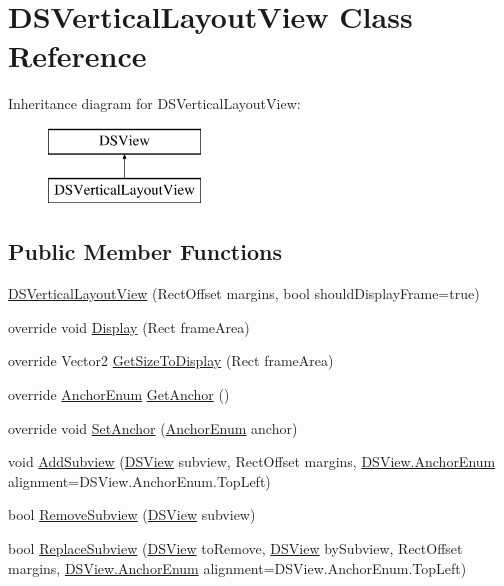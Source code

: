 \hypertarget{class_d_s_vertical_layout_view}{\section{D\+S\+Vertical\+Layout\+View Class Reference}
\label{class_d_s_vertical_layout_view}
}
Inheritance diagram for D\+S\+Vertical\+Layout\+View\+:\begin{figure}[H]
\begin{center}
\leavevmode
\includegraphics[height=2.000000cm]{class_d_s_vertical_layout_view}
\end{center}
\end{figure}
\subsection*{Public Member Functions}
\begin{DoxyCompactItemize}
\item 
\hyperlink{class_d_s_vertical_layout_view_afd5afdd6ab5252ce1a16bed8244b84e3}{D\+S\+Vertical\+Layout\+View} (Rect\+Offset margins, bool should\+Display\+Frame=true)
\item 
override void \hyperlink{class_d_s_vertical_layout_view_a95419d6cd053c5c47c500185def47cd9}{Display} (Rect frame\+Area)
\item 
override Vector2 \hyperlink{class_d_s_vertical_layout_view_a94bab7358b64b4d4dc4f63395ab59685}{Get\+Size\+To\+Display} (Rect frame\+Area)
\item 
override \hyperlink{class_d_s_view_a8b41b9ec1b18bd33872a37cbd3a2dbe1}{Anchor\+Enum} \hyperlink{class_d_s_vertical_layout_view_a42bac003dfe1c5c8b34ea4907a283344}{Get\+Anchor} ()
\item 
override void \hyperlink{class_d_s_vertical_layout_view_a94e9be4040f88097b8c825cbf647ea27}{Set\+Anchor} (\hyperlink{class_d_s_view_a8b41b9ec1b18bd33872a37cbd3a2dbe1}{Anchor\+Enum} anchor)
\item 
void \hyperlink{class_d_s_vertical_layout_view_a6d1fb07058bb96859326732d74eaee54}{Add\+Subview} (\hyperlink{class_d_s_view}{D\+S\+View} subview, Rect\+Offset margins, \hyperlink{class_d_s_view_a8b41b9ec1b18bd33872a37cbd3a2dbe1}{D\+S\+View.\+Anchor\+Enum} alignment=D\+S\+View.\+Anchor\+Enum.\+Top\+Left)
\item 
bool \hyperlink{class_d_s_vertical_layout_view_aec81469f36a7df3f7efb383c215603ca}{Remove\+Subview} (\hyperlink{class_d_s_view}{D\+S\+View} subview)
\item 
bool \hyperlink{class_d_s_vertical_layout_view_aaece476eeeb9c8d586aa2f7006c8e869}{Replace\+Subview} (\hyperlink{class_d_s_view}{D\+S\+View} to\+Remove, \hyperlink{class_d_s_view}{D\+S\+View} by\+Subview, Rect\+Offset margins, \hyperlink{class_d_s_view_a8b41b9ec1b18bd33872a37cbd3a2dbe1}{D\+S\+View.\+Anchor\+Enum} alignment=D\+S\+View.\+Anchor\+Enum.\+Top\+Left)
\end{DoxyCompactItemize}
